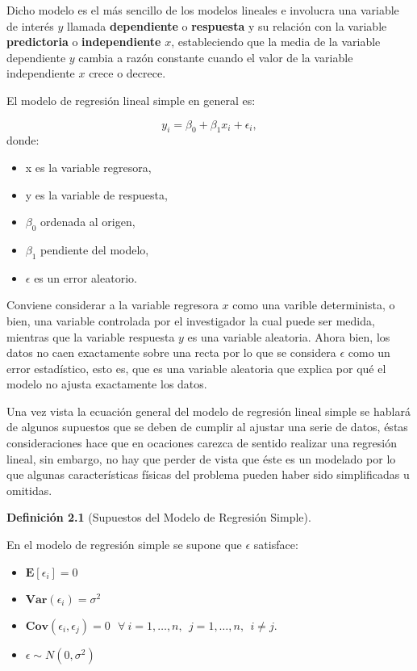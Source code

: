 \documentclass[
  a4paper,
  oneside,
  openany]{book}
\begin{document}
Dicho modelo es el más sencillo de los modelos lineales e involucra una variable de interés \(y\) llamada \textbf{dependiente} o \textbf{respuesta} y su relación con la variable \textbf{predictoria} o \textbf{independiente} \(x\), estableciendo que la media de la variable dependiente \(y\) cambia a razón constante cuando el valor de la variable independiente \(x\) crece o decrece.

El modelo de regresión lineal simple en general es:

\[y_{i}=\beta_{0}+\beta_{1}x_{i}+\epsilon_{i},\]
donde:

\begin{itemize}
\item
  x es la variable regresora,
\item
  y es la variable de respuesta,
\item
  \(\beta_{0}\) ordenada al origen,
\item
  \(\beta_{1}\) pendiente del modelo,
\item
  \(\epsilon\) es un error aleatorio.
\end{itemize}

Conviene considerar a la variable regresora \(x\) como una varible determinista, o bien, una variable controlada por el investigador la cual puede ser medida, mientras que la variable respuesta \(y\) es una variable aleatoria. Ahora bien, los datos no caen exactamente sobre una recta por lo que se considera \(\epsilon\) como un error estadístico, esto es, que es una variable aleatoria que explica por qué el modelo no ajusta exactamente los datos.

Una vez vista la ecuación general del modelo de regresión lineal simple se hablará de algunos supuestos que se deben de cumplir al ajustar una serie de datos, éstas consideraciones hace que en ocaciones carezca de sentido realizar una regresión lineal, sin embargo, no hay que perder de vista que éste es un modelado por lo que algunas características físicas del problema pueden haber sido simplificadas u omitidas.

\textbf{Definición 2.1} (Supuestos del Modelo de Regresión Simple).

En el modelo de regresión simple se supone que \(\epsilon\) satisface:

\begin{itemize}
\item
  \(\mathbf{E}[\epsilon_{i}]=0\)
\item
  \(\textbf{Var}(\epsilon_{i})=\sigma^2\)
\item
  \(\textbf{Cov}(\epsilon_{i},\epsilon_{j})= 0 \  \ \ \forall \ i = 1, \ldots, n, \ \  j=1, \ldots, n, \ \  i \neq j.\)
\item
  \(\epsilon \sim N(0,\sigma^2)\)
\end{itemize}
\end{document}
